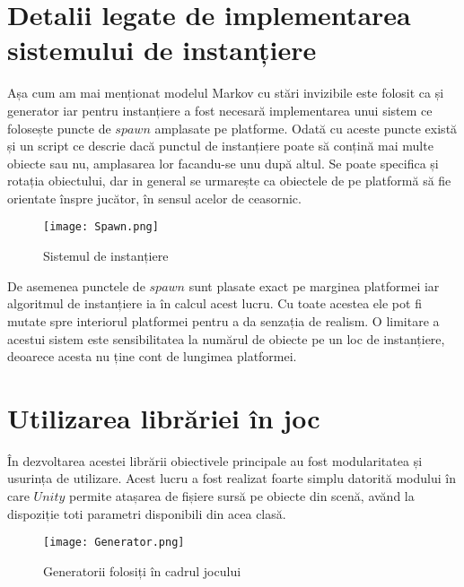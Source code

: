 \section{Detalii legate de implementarea sistemului de instanțiere}

Așa cum am mai menționat modelul Markov cu stări invizibile este folosit ca și generator iar pentru instanțiere a fost necesară implementarea unui sistem ce folosește puncte de $spawn$ amplasate pe platforme. Odată cu aceste puncte există și un script ce descrie dacă punctul de instanțiere poate să conțină mai multe obiecte sau nu, amplasarea lor facandu-se unu după altul. Se poate specifica și rotația obiectului, dar in general se urmarește ca obiectele de pe platformă să fie orientate înspre jucător, în sensul acelor de ceasornic.\par

\vspace{10mm}
\begin{figure}[H]
\centering
\texttt{[image: Spawn.png]} \par
\caption{Sistemul de instanțiere}
\end{figure}

De asemenea punctele de $spawn$ sunt plasate exact pe marginea platformei iar algoritmul de instanțiere ia în calcul acest lucru. Cu toate acestea ele pot fi mutate spre interiorul platformei pentru a da senzația de realism. O limitare a acestui sistem este sensibilitatea la numărul de obiecte pe un loc de instanțiere, deoarece acesta nu ține cont de lungimea platformei.

\section{Utilizarea librăriei în joc}

În dezvoltarea acestei librării obiectivele principale au fost modularitatea și usurința de utilizare. Acest lucru a fost realizat foarte simplu datorită modului în care $Unity$ permite atașarea de fișiere sursă pe obiecte din scenă, avănd la dispoziție toti parametri disponibili din acea clasă.\par

\vspace{10mm}
\begin{figure}[H]
\centering
\texttt{[image: Generator.png]} \par
\caption{Generatorii folosiți în cadrul jocului}
\end{figure}


